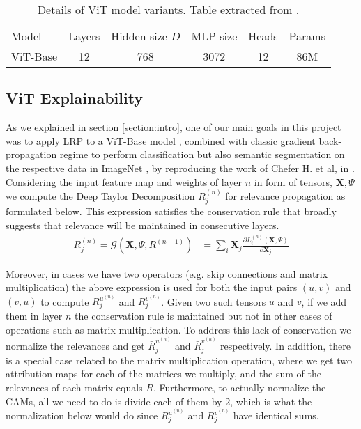 \begin{table}[]
\centering \begin{adjustbox}{width=0.7\textwidth} \small
\begin{tabular}{l c c c c c}
Model            & Layers & Hidden size $D$ & MLP size &  Heads  & Params \\
ViT-Base   &   12   &        768      &   3072   &   12    &   86M  \\
\end{tabular}
\end{adjustbox}
\caption{Details of ViT model variants. Table extracted from \cite{visiontransformer}.}
\label{tbl:models}
\end{table}

\subsection{ViT Explainability}
\label{sub:3.2}
As we explained in section \ref{section:intro}, one of our main goals in this project was to apply LRP \cite{renormalizationLRP} to a ViT-Base model \cite{visiontransformer}, combined with classic gradient back-propagation regime to perform classification but also semantic segmentation on the respective data in ImageNet \cite{russakovsky2015ImageNet, imagenet-seg}, by reproducing the work of Chefer H. et al, in \cite{mainpaper}. Considering the input feature map and weights of layer $n$ in form
of tensors, $\mathbf{X}, \Psi$ we compute the Deep Taylor Decomposition $R_j^{(n)}$ for relevance propagation as formulated below. This expression satisfies the conservation rule that broadly suggests that relevance will be maintained in consecutive layers.
\begin{align}
    \nonumber
    R_j^{(n)} = \mathcal{G}\left(\mathbf{X}, \Psi, R^{(n-1)}\right)
    &= \sum_{i} \mathbf{X}_j \frac{\partial L_i^{(n)}(\mathbf{X}, \Psi)}{\partial\textbf{X}_j}
\end{align}

Moreover, in cases we have two operators (e.g. skip connections and matrix multiplication) the above expression is used for both the input pairs $(u, v)$ and $(v, u)$ to compute $R_j^{{u}^{(n)}}$ and $R_j^{{v}^{(n)}}$. Given two such tensors $u$ and $v$, if we add them in layer $n$ the conservation rule is maintained but not in other cases of operations such as matrix multiplication. To address this lack of conservation we normalize the relevances and get $\bar{R}_j^{{u}^{(n)}}$ and $\bar{R}_j^{{v}^{(n)}}$ respectively. In addition, there is a special case related to the matrix multiplication operation, where we get two attribution maps for each of the matrices we multiply, and the sum of the relevances of each matrix equals $R$. Furthermore, to actually normalize the CAMs, all we need to do is divide each of them by $2$, which is what the normalization below would do since $R_j^{{u}^{(n)}}$ and $R_j^{{v}^{(n)}}$  have identical sums.

